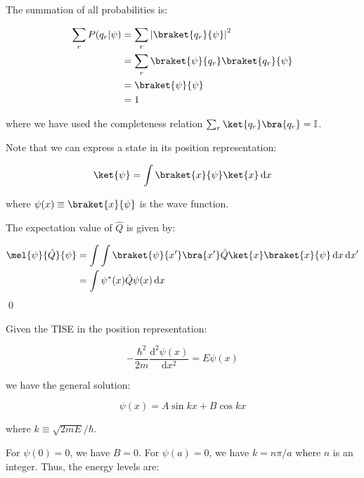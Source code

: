 \documentclass[12pt]{article}
\begin{document}
The summation of all probabilities is:

\begin{equation}
\begin{split}
    \sum_{r} P(q_{r} | \psi) &= \sum_{r} \left\lvert \braket{q_{r}}{\psi} \right\rvert^{2} \\
    &= \sum_{r} \braket{\psi}{q_{r}} \braket{q_{r}}{\psi} \\
    &= \braket{\psi}{\psi} \\
    &= 1
\end{split}
\end{equation}

where we have used the completeness relation $\sum_{r} \ket{q_{r}} \bra{q_{r}} = \mathbb{I}$.

Note that we can express a state in its position representation:

\begin{equation}
    \ket{\psi} = \int \braket{x}{\psi} \ket{x} \, \mathrm{d}x
\end{equation}

where $\psi(x) \equiv \braket{x}{\psi}$ is the wave function.

The expectation value of $\hat{Q}$ is given by:

\begin{equation}
\begin{split}
    \mel{\psi}{\hat{Q}}{\psi} &= \int \int \braket{\psi}{x'} \bra{x'} \hat{Q} \ket{x} \braket{x}{\psi} \, \mathrm{d}x \, \mathrm{d}x' \\
    &= \int \psi^{*}(x) \hat{Q} \psi(x) \, \mathrm{d}x
\end{split}
\end{equation}
\qed



Given the TISE in the position representation:

\begin{equation}
    -\frac{\hbar^{2}}{2m} \frac{\mathrm{d}^{2} \psi(x)}{\mathrm{d}x^{2}} = E \psi(x)
\end{equation}

we have the general solution:

\begin{equation}
    \psi(x) = A \sin{kx} + B \cos{kx}
\end{equation}

where $k \equiv \sqrt{2mE}/\hbar$.

For $\psi(0) = 0$, we have $B = 0$. For $\psi(a) = 0$, we have $k = n\pi/a$ where $n$ is an integer. Thus, the energy levels are:
\end{document}
